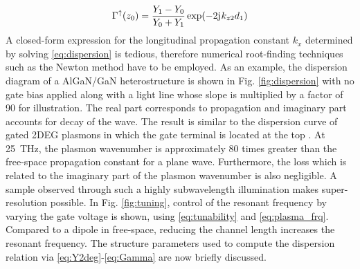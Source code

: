 \documentclass[10pt]{article}
\renewcommand{\^}{\hat}  %
\renewcommand{\^}{\hat}  %
\renewcommand{\j}{\mathrm{j}\mkern1mu} %
\begin{document}
%
\begin{equation}
  \Gamma^{\uparrow}(z_0) = \frac{Y_1 - Y_0}{Y_0 + Y_1} \exp(-2\j k_{z2}d_1)
  \label{eq:Gamma}
\end{equation}
%
A closed-form expression for the longitudinal propagation constant $k_x$ determined by solving \eqref{eq:dispersion} is tedious, therefore numerical root-finding techniques such as the Newton method \cite{9780521880688} have to be employed. As an example, the dispersion diagram of a AlGaN/GaN heterostructure is shown in Fig. \ref{fig:dispersion} with no gate bias applied along with a light line whose slope is multiplied by a factor of 90 for illustration. The real part corresponds to propagation and imaginary part accounts for decay of the wave. The result is similar to the dispersion curve of gated 2DEG plasmons in which the gate terminal is located at the top \cite{Nakayama1974, Eguiluz1975}. At \SI{25}{\THz}, the plasmon wavenumber is approximately 80 times greater than the free-space propagation constant for a plane wave. Furthermore, the loss which is related to the imaginary part of the plasmon wavenumber is also negligible. A sample observed through such a highly subwavelength illumination makes
super-resolution possible. In Fig. \ref{fig:tuning}, control of the resonant frequency by varying the gate voltage is shown, using \eqref{eq:tunability} and \eqref{eq:plasma_frq}. Compared to a dipole in free-space, reducing the channel length increases the resonant frequency. The structure parameters used to compute the
dispersion relation via \eqref{eq:Y2deg}-\eqref{eq:Gamma} are now briefly discussed.
\end{document}
